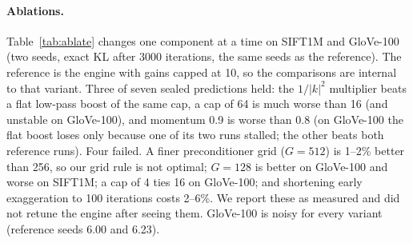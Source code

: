 \documentclass[11pt]{article}
\begin{document}
\paragraph{Ablations.} Table~\ref{tab:ablate} changes one component at a time on SIFT1M and GloVe-100 (two seeds,
exact KL after 3000 iterations, the same seeds as the reference). The reference is the engine with gains capped at 10,
so the comparisons are internal to that variant. Three of seven sealed predictions held: the $1/|k|^2$ multiplier beats
a flat low-pass boost of the same cap, a cap of 64 is much worse than 16 (and unstable on GloVe-100), and momentum 0.9
is worse than 0.8 (on GloVe-100 the flat boost loses only because one of its two runs stalled; the other beats both
reference runs). Four failed. A finer preconditioner grid ($G=512$) is 1--2\% better than 256, so our grid rule is
not optimal; $G=128$ is better on GloVe-100 and worse on SIFT1M; a cap of 4 ties 16 on GloVe-100; and shortening
early exaggeration to 100 iterations costs 2--6\%. We report these as measured and did not retune the engine after
seeing them. GloVe-100 is noisy for every variant (reference seeds 6.00 and 6.23).
\begin{table}[t]\centering\small\resizebox{\linewidth}{!}{}
\caption{Ablations at $10^6$ points: mean exact KL after 3000 iterations over two seeds, and the change against the
reference on the same seeds. The predictions were sealed before the runs.}\label{tab:ablate}\end{table}
\end{document}
